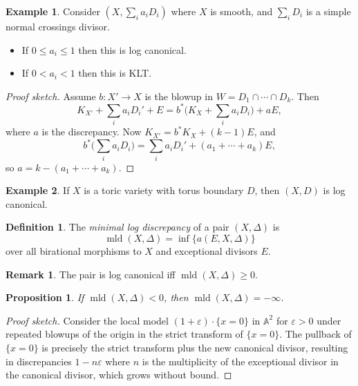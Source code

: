 \documentclass{article}
\newtheorem*{proposition}{Proposition}
\theoremstyle{definition}
\newtheorem*{definition}{Definition}
\newtheorem*{example}{Example}
\newtheorem*{remark}{Remark}
\DeclareMathOperator{\mld}{mld}
\newcommand{\A}{\mathbb{A}}
\begin{document}
\begin{example}
    Consider $(X,\sum_ia_iD_i)$ where $X$ is smooth, and $\sum_iD_i$ is a simple
    normal crossings divisor.
    \begin{itemize}
        \item If $0\le a_i\le1$ then this is log canonical.
        \item If $0<a_i<1$ then this is KLT.
    \end{itemize}
    \begin{proof}[Proof sketch]
        Assume $b:X'\to X$ is the blowup in $W=D_1\cap\cdots\cap D_k$. Then
        \begin{equation*}
            K_{X'} + \sum_ia_iD_i' + E
                = b^*\biggl(K_X + \sum_ia_iD_i\biggr) + aE,
        \end{equation*}
        where $a$ is the discrepancy. Now $K_{X'}=b^*K_X+(k-1)E$, and
        \begin{equation*}
            b^*\biggl(\sum_ia_iD_i\biggr) = \sum_ia_iD_i' + (a_1+\cdots+a_k)E,
        \end{equation*}
        so $a=k-(a_1+\cdots+a_k)$.
    \end{proof}
\end{example}

\begin{example}
    If $X$ is a toric variety with torus boundary $D$, then $(X,D)$ is log
    canonical.
\end{example}

\begin{definition}
    The \emph{minimal log discrepancy} of a pair $(X,\Delta)$ is
    \begin{equation*}
        \mld(X,\Delta) = \inf\{a(E,X,\Delta)\}
    \end{equation*}
    over all birational morphisms to $X$ and exceptional divisors $E$.
\end{definition}

\begin{remark}
    The pair is log canonical iff $\mld(X,\Delta)\ge0$.
\end{remark}

\begin{proposition}
    If $\mld(X,\Delta)<0$, then $\mld(X,\Delta)=-\infty$.
\end{proposition}

\begin{proof}[Proof sketch]
    Consider the local model $(1+\varepsilon)\cdot\{x=0\}$ in $\A^2$ for
    $\varepsilon>0$ under repeated blowups of the origin in the strict transform
    of $\{x=0\}$. The pullback of $\{x=0\}$ is precisely the strict transform
    plus the new canonical divisor, resulting in discrepancies $1-n\varepsilon$
    where $n$ is the multiplicity of the exceptional divisor in the canonical
    divisor, which grows without bound.
\end{proof}
\end{document}
